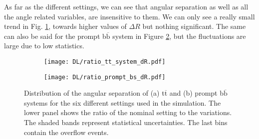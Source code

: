 \indent As far as the different settings, we can see that angular separation as well as all the angle related variables, are insensitive to them. We can only see a really small trend in Fig. \ref{subfig:dR(ttbar)_DL}, towards higher values of $\Delta R$ but nothing significant. The same can also be said for the prompt  b$\overline{\text{b}}$ system in Figure \ref{subfig:dR(bbbar_prompt)_DL}, but the fluctuations are large due to low statistics.
\begin{figure}[H]
    \centering
    \begin{subfigure}{0.49\textwidth}
        \centering
        \texttt{[image: DL/ratio\_tt\_system\_dR.pdf]}
        \caption{}
        \label{subfig:dR(ttbar)_DL}        
    \end{subfigure}
    \hfill
    \begin{subfigure}{0.49\linewidth}
        \centering
        \texttt{[image: DL/ratio\_prompt\_bs\_dR.pdf]}
        \caption{}
        \label{subfig:dR(bbbar_prompt)_DL}
    \end{subfigure}
    \caption{Distribution of the angular separation of (a) t$\overline{\text{t}}$ and (b) prompt b$\overline{\text{b}}$ systems for the six different settings used in the simulation. The lower panel shows the ratio of the nominal setting to the variations. The shaded bands represent statistical uncertainties. The last bins contain the overflow events.}
    \label{fig:dR_DL}
\end{figure}

